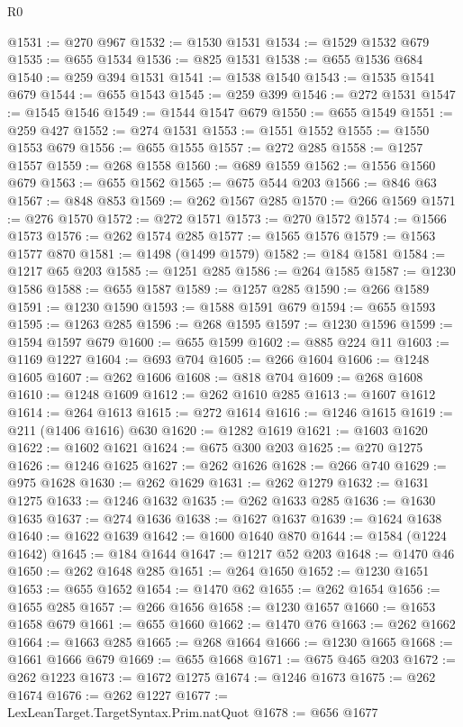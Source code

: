 \begin{lexlean}{R0}
\begin{coremodule}
@1531 := @270 @967
@1532 := @1530 @1531
@1534 := @1529 @1532 @679
@1535 := @655 @1534
@1536 := @825 @1531
@1538 := @655 @1536 @684
@1540 := @259 @394 @1531
@1541 := @1538 @1540
@1543 := @1535 @1541 @679
@1544 := @655 @1543
@1545 := @259 @399
@1546 := @272 @1531
@1547 := @1545 @1546
@1549 := @1544 @1547 @679
@1550 := @655 @1549
@1551 := @259 @427
@1552 := @274 @1531
@1553 := @1551 @1552
@1555 := @1550 @1553 @679
@1556 := @655 @1555
@1557 := @272 @285
@1558 := @1257 @1557
@1559 := @268 @1558
@1560 := @689 @1559
@1562 := @1556 @1560 @679
@1563 := @655 @1562
@1565 := @675 @544 @203
@1566 := @846 @63
@1567 := @848 @853
@1569 := @262 @1567 @285
@1570 := @266 @1569
@1571 := @276 @1570
@1572 := @272 @1571
@1573 := @270 @1572
@1574 := @1566 @1573
@1576 := @262 @1574 @285
@1577 := @1565 @1576
@1579 := @1563 @1577 @870
@1581 := @1498 (@1499 @1579)
@1582 := @184 @1581
@1584 := @1217 @65 @203
@1585 := @1251 @285
@1586 := @264 @1585
@1587 := @1230 @1586
@1588 := @655 @1587
@1589 := @1257 @285
@1590 := @266 @1589
@1591 := @1230 @1590
@1593 := @1588 @1591 @679
@1594 := @655 @1593
@1595 := @1263 @285
@1596 := @268 @1595
@1597 := @1230 @1596
@1599 := @1594 @1597 @679
@1600 := @655 @1599
@1602 := @885 @224 @11
@1603 := @1169 @1227
@1604 := @693 @704
@1605 := @266 @1604
@1606 := @1248 @1605
@1607 := @262 @1606
@1608 := @818 @704
@1609 := @268 @1608
@1610 := @1248 @1609
@1612 := @262 @1610 @285
@1613 := @1607 @1612
@1614 := @264 @1613
@1615 := @272 @1614
@1616 := @1246 @1615
@1619 := @211 (@1406 @1616) @630
@1620 := @1282 @1619
@1621 := @1603 @1620
@1622 := @1602 @1621
@1624 := @675 @300 @203
@1625 := @270 @1275
@1626 := @1246 @1625
@1627 := @262 @1626
@1628 := @266 @740
@1629 := @975 @1628
@1630 := @262 @1629
@1631 := @262 @1279
@1632 := @1631 @1275
@1633 := @1246 @1632
@1635 := @262 @1633 @285
@1636 := @1630 @1635
@1637 := @274 @1636
@1638 := @1627 @1637
@1639 := @1624 @1638
@1640 := @1622 @1639
@1642 := @1600 @1640 @870
@1644 := @1584 (@1224 @1642)
@1645 := @184 @1644
@1647 := @1217 @52 @203
@1648 := @1470 @46
@1650 := @262 @1648 @285
@1651 := @264 @1650
@1652 := @1230 @1651
@1653 := @655 @1652
@1654 := @1470 @62
@1655 := @262 @1654
@1656 := @1655 @285
@1657 := @266 @1656
@1658 := @1230 @1657
@1660 := @1653 @1658 @679
@1661 := @655 @1660
@1662 := @1470 @76
@1663 := @262 @1662
@1664 := @1663 @285
@1665 := @268 @1664
@1666 := @1230 @1665
@1668 := @1661 @1666 @679
@1669 := @655 @1668
@1671 := @675 @465 @203
@1672 := @262 @1223
@1673 := @1672 @1275
@1674 := @1246 @1673
@1675 := @262 @1674
@1676 := @262 @1227
@1677 := LexLeanTarget.TargetSyntax.Prim.natQuot
@1678 := @656 @1677

\end{coremodule}
\end{lexlean}
